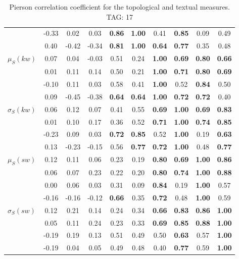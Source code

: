 \begin{table*}[h!]
\begin{center}
\begin{tabular}{| l || c | c | c | c | c | c | c | c | c |}
 & -0.33 & 0.02 & 0.03 & {\bf 0.86} & {\bf 1.00} & 0.41 & {\bf 0.85} & 0.09 & 0.49 \\
 & 0.40 & -0.42 & -0.34 & {\bf 0.81} & {\bf 1.00} & {\bf 0.64} & {\bf 0.77} & 0.35 & 0.48 \\\hline
$\mu_S(kw)$ & 0.07 & 0.04 & -0.03 & 0.51 & 0.24 & {\bf 1.00} & {\bf 0.69} & {\bf 0.80} & {\bf 0.66} \\
 & 0.01 & 0.11 & 0.14 & 0.50 & 0.21 & {\bf 1.00} & {\bf 0.71} & {\bf 0.80} & {\bf 0.69} \\
 & -0.10 & 0.11 & 0.03 & 0.58 & 0.41 & {\bf 1.00} & 0.52 & {\bf 0.84} & 0.50 \\
 & 0.09 & -0.45 & -0.38 & {\bf 0.64} & {\bf 0.64} & {\bf 1.00} & {\bf 0.72} & {\bf 0.72} & 0.40 \\\hline
$\sigma_S(kw)$ & 0.06 & 0.12 & 0.07 & 0.41 & 0.55 & {\bf 0.69} & {\bf 1.00} & {\bf 0.69} & {\bf 0.83} \\
 & 0.01 & 0.10 & 0.17 & 0.36 & 0.52 & {\bf 0.71} & {\bf 1.00} & {\bf 0.74} & {\bf 0.85} \\
 & -0.23 & 0.09 & 0.03 & {\bf 0.72} & {\bf 0.85} & 0.52 & {\bf 1.00} & 0.19 & {\bf 0.63} \\
 & 0.13 & -0.23 & -0.15 & 0.56 & {\bf 0.77} & {\bf 0.72} & {\bf 1.00} & 0.48 & {\bf 0.77} \\\hline
$\mu_S(sw)$ & 0.12 & 0.11 & 0.06 & 0.23 & 0.19 & {\bf 0.80} & {\bf 0.69} & {\bf 1.00} & {\bf 0.86} \\
 & 0.06 & 0.07 & 0.23 & 0.22 & 0.20 & {\bf 0.80} & {\bf 0.74} & {\bf 1.00} & {\bf 0.88} \\
 & 0.00 & 0.06 & 0.03 & 0.31 & 0.09 & {\bf 0.84} & 0.19 & {\bf 1.00} & 0.57 \\
 & -0.16 & -0.16 & -0.12 & {\bf 0.66} & 0.35 & {\bf 0.72} & 0.48 & {\bf 1.00} & 0.59 \\\hline
$\sigma_S(sw)$ & 0.12 & 0.21 & 0.14 & 0.24 & 0.34 & {\bf 0.66} & {\bf 0.83} & {\bf 0.86} & {\bf 1.00} \\
 & 0.05 & 0.11 & 0.24 & 0.23 & 0.33 & {\bf 0.69} & {\bf 0.85} & {\bf 0.88} & {\bf 1.00} \\
 & -0.19 & 0.19 & 0.13 & 0.51 & 0.49 & 0.50 & {\bf 0.63} & 0.57 & {\bf 1.00} \\
 & -0.19 & 0.04 & 0.05 & 0.49 & 0.48 & 0.40 & {\bf 0.77} & 0.59 & {\bf 1.00} \\\hline
\end{tabular}
\caption{Pierson correlation coefficient for the topological and textual measures. TAG: 17}
\end{center}
\end{table*}